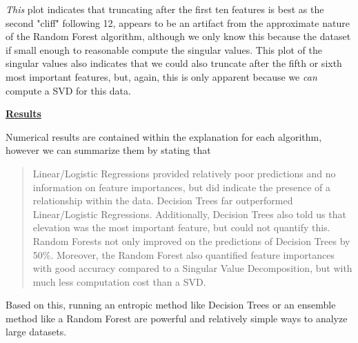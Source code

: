 \documentclass{article}[12pt]
\numberwithin{equation}{subsection}
\begin{document}
\begin{flushleft}
\emph{This} plot indicates that truncating after the first ten features is best as the second "cliff" following 12, appears to be an artifact from the approximate nature of the Random Forest algorithm, although we only know this because the dataset if small enough to reasonable compute the singular values.  This plot of the singular values also indicates that we could also truncate after the fifth or sixth most important features, but, again, this is only apparent because we \emph{can} compute a SVD for this data.


\vspace{1.5in}

\begin{large} \textbf{\underline{Results}} \end{large}

Numerical results are contained within the explanation for each algorithm, however we can summarize them by stating that

\begin{quote}
Linear/Logistic Regressions provided relatively poor predictions and no information on feature importances, but did indicate the presence of a relationship within the data.  Decision Trees far outperformed Linear/Logistic Regressions.  Additionally, Decision Trees also told us that elevation was the most important feature, but could not quantify this.  Random Forests not only improved on the predictions of Decision Trees by 50\%.  Moreover, the Random Forest also quantified feature importances with good accuracy compared to a Singular Value Decomposition, but with much less computation cost than a SVD.
\end{quote}

Based on this, running an entropic method like Decision Trees or an ensemble method like a Random Forest are  powerful and relatively simple ways to analyze large datasets.


































































\end{flushleft}
\end{document}
